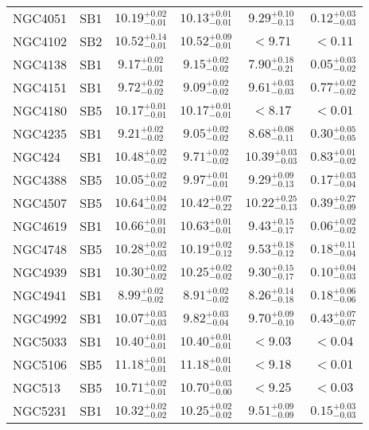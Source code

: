 \documentclass[onecolumn]{mn2e}
\begin{document}
{\begin{center}
\begin{longtable}{lccccc}
NGC4051 & SB1 & $10.19_{-0.01}^{+0.02}$ & $10.13_{-0.01}^{+0.01}$ & $9.29_{-0.13}^{+0.10}$ &$0.12_{-0.03}^{+0.03}$ \\
NGC4102 & SB2 & $10.52_{-0.01}^{+0.14}$ & $10.52_{-0.01}^{+0.09}$ & $<9.71$ &$<0.11$ \\
NGC4138 & SB1 & $9.17_{-0.01}^{+0.02}$ & $9.15_{-0.02}^{+0.02}$ & $7.90_{-0.21}^{+0.18}$ &$0.05_{-0.02}^{+0.03}$ \\
NGC4151 & SB1 & $9.72_{-0.02}^{+0.02}$ & $9.09_{-0.02}^{+0.02}$ & $9.61_{-0.03}^{+0.03}$ &$0.77_{-0.02}^{+0.02}$ \\
NGC4180 & SB5 & $10.17_{-0.01}^{+0.01}$ & $10.17_{-0.01}^{+0.01}$ & $<8.17$ &$<0.01$ \\
NGC4235 & SB1 & $9.21_{-0.02}^{+0.02}$ & $9.05_{-0.02}^{+0.02}$ & $8.68_{-0.11}^{+0.08}$ &$0.30_{-0.05}^{+0.05}$ \\
NGC424 & SB1 & $10.48_{-0.02}^{+0.02}$ & $9.71_{-0.02}^{+0.02}$ & $10.39_{-0.03}^{+0.03}$ &$0.83_{-0.02}^{+0.01}$ \\
NGC4388 & SB5 & $10.05_{-0.02}^{+0.02}$ & $9.97_{-0.01}^{+0.01}$ & $9.29_{-0.13}^{+0.09}$ &$0.17_{-0.04}^{+0.03}$ \\
NGC4507 & SB5 & $10.64_{-0.02}^{+0.04}$ & $10.42_{-0.22}^{+0.07}$ & $10.22_{-0.13}^{+0.25}$ &$0.39_{-0.09}^{+0.27}$ \\
NGC4619 & SB1 & $10.66_{-0.01}^{+0.01}$ & $10.63_{-0.01}^{+0.01}$ & $9.43_{-0.17}^{+0.15}$ &$0.06_{-0.02}^{+0.02}$ \\
NGC4748 & SB5 & $10.28_{-0.03}^{+0.02}$ & $10.19_{-0.12}^{+0.02}$ & $9.53_{-0.12}^{+0.18}$ &$0.18_{-0.04}^{+0.11}$ \\
NGC4939 & SB1 & $10.30_{-0.02}^{+0.02}$ & $10.25_{-0.02}^{+0.02}$ & $9.30_{-0.17}^{+0.15}$ &$0.10_{-0.03}^{+0.04}$ \\
NGC4941 & SB1 & $8.99_{-0.02}^{+0.02}$ & $8.91_{-0.02}^{+0.02}$ & $8.26_{-0.18}^{+0.14}$ &$0.18_{-0.06}^{+0.06}$ \\
NGC4992 & SB1 & $10.07_{-0.03}^{+0.03}$ & $9.82_{-0.04}^{+0.03}$ & $9.70_{-0.10}^{+0.09}$ &$0.43_{-0.07}^{+0.07}$ \\
NGC5033 & SB1 & $10.40_{-0.01}^{+0.01}$ & $10.40_{-0.01}^{+0.01}$ & $<9.03$ &$<0.04$ \\
NGC5106 & SB5 & $11.18_{-0.01}^{+0.01}$ & $11.18_{-0.01}^{+0.01}$ & $<9.18$ &$<0.01$ \\
NGC513 & SB5 & $10.71_{-0.01}^{+0.02}$ & $10.70_{-0.00}^{+0.03}$ & $<9.25$ &$<0.03$ \\
NGC5231 & SB1 & $10.32_{-0.02}^{+0.02}$ & $10.25_{-0.02}^{+0.02}$ & $9.51_{-0.09}^{+0.09}$ &$0.15_{-0.03}^{+0.03}$ \\

\end{longtable}
\end{center}}
\end{document}
